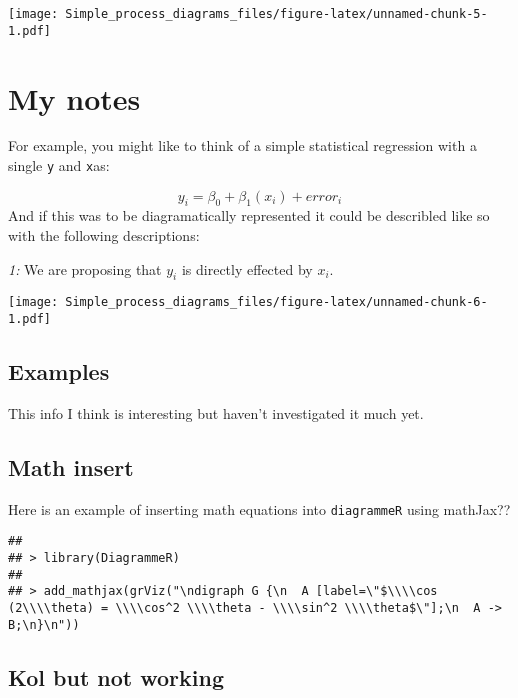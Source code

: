 \documentclass[]{book}
\begin{document}
\texttt{[image: Simple\_process\_diagrams\_files/figure-latex/unnamed-chunk-5-1.pdf]}

\hypertarget{my-notes}{%
\section{My notes}\label{my-notes}}

For example, you might like to think of a simple statistical regression with a single \texttt{y} and \texttt{x}as:

\[ y_i = \beta_0 + \beta_1(x_i) + error_i \]
And if this was to be diagramatically represented it could be describled like so with the following descriptions:

\emph{1:} We are proposing that \(y_i\) is directly effected by \(x_i\).

\texttt{[image: Simple\_process\_diagrams\_files/figure-latex/unnamed-chunk-6-1.pdf]}

\hypertarget{examples}{%
\subsection{Examples}\label{examples}}

This info I think is interesting but haven't investigated it much yet.

\hypertarget{math-insert}{%
\subsection{Math insert}\label{math-insert}}

Here is an example of inserting math equations into \texttt{diagrammeR} using mathJax??

\begin{verbatim}
## 
## > library(DiagrammeR)
## 
## > add_mathjax(grViz("\ndigraph G {\n  A [label=\"$\\\\cos (2\\\\theta) = \\\\cos^2 \\\\theta - \\\\sin^2 \\\\theta$\"];\n  A -> B;\n}\n"))
\end{verbatim}

\hypertarget{kol-but-not-working}{%
\subsection{Kol but not working}\label{kol-but-not-working}}
\end{document}
